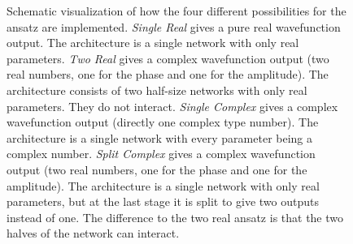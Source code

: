 \begin{figure}[htbp]
    \centering
    \caption{
        Schematic visualization of how the four different possibilities for the ansatz are implemented.
        \emph{Single Real} gives a pure real wavefunction output. The architecture is a single network with only real parameters.
        \emph{Two Real} gives a complex wavefunction output (two real numbers, one for the phase and one for the amplitude). The architecture consists of two half-size networks with only real parameters. They do not interact.
        \emph{Single Complex} gives a complex wavefunction output (directly one complex type number). The architecture is a single network with every parameter being a complex number.
        \emph{Split Complex} gives a complex wavefunction output (two real numbers, one for the phase and one for the amplitude). The architecture is a single network with only real parameters, but at the last stage it is split to give two outputs instead of one. The difference to the two real ansatz is that the two \glqq halves\grqq{} of the network can interact.
    }
    \label{fig:ansatz-comparisons}
    

\end{figure}
